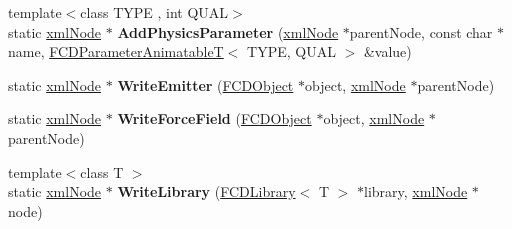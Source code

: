 \begin{DoxyCompactItemize}
\item 
\hypertarget{classFArchiveXML_a4d9c42167dff390182688c8b0b553693}{
{\footnotesize template$<$class TYPE , int QUAL$>$ }\\static \hyperlink{struct__xmlNode}{xmlNode} $\ast$ {\bfseries AddPhysicsParameter} (\hyperlink{struct__xmlNode}{xmlNode} $\ast$parentNode, const char $\ast$name, \hyperlink{classFCDParameterAnimatableT}{FCDParameterAnimatableT}$<$ TYPE, QUAL $>$ \&value)}
\label{classFArchiveXML_a4d9c42167dff390182688c8b0b553693}

\item 
\hypertarget{classFArchiveXML_ab2fc171640ac284e1a8ccb82bfb4c93e}{
static \hyperlink{struct__xmlNode}{xmlNode} $\ast$ {\bfseries WriteEmitter} (\hyperlink{classFCDObject}{FCDObject} $\ast$object, \hyperlink{struct__xmlNode}{xmlNode} $\ast$parentNode)}
\label{classFArchiveXML_ab2fc171640ac284e1a8ccb82bfb4c93e}

\item 
\hypertarget{classFArchiveXML_a81561f5cb4769c862a0ba58d5f17dfa3}{
static \hyperlink{struct__xmlNode}{xmlNode} $\ast$ {\bfseries WriteForceField} (\hyperlink{classFCDObject}{FCDObject} $\ast$object, \hyperlink{struct__xmlNode}{xmlNode} $\ast$parentNode)}
\label{classFArchiveXML_a81561f5cb4769c862a0ba58d5f17dfa3}

\item 
\hypertarget{classFArchiveXML_adc1373f3352980407c75d9a8e81d026d}{
{\footnotesize template$<$class T $>$ }\\static \hyperlink{struct__xmlNode}{xmlNode} $\ast$ {\bfseries WriteLibrary} (\hyperlink{classFCDLibrary}{FCDLibrary}$<$ T $>$ $\ast$library, \hyperlink{struct__xmlNode}{xmlNode} $\ast$node)}
\label{classFArchiveXML_adc1373f3352980407c75d9a8e81d026d}

\end{DoxyCompactItemize}


